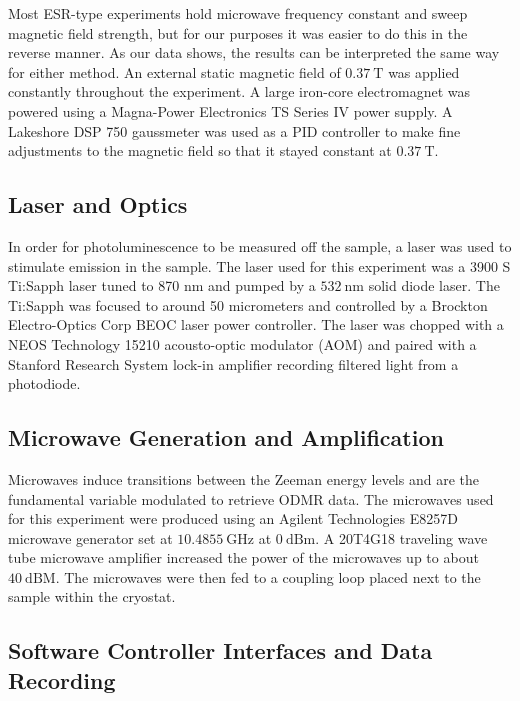 \documentclass[oneside]{BYUPhys}
\begin{document}
Most ESR-type experiments hold microwave frequency constant and sweep magnetic field strength, but for our purposes it was easier to do this in the reverse manner. As our data shows, the results can be interpreted the same way for either method. An external static magnetic field of $0.37~\text{T}$ was applied constantly throughout the experiment. A large iron-core electromagnet was powered using a Magna-Power Electronics TS Series IV power supply. A Lakeshore DSP 750 gaussmeter was used as a PID controller to make fine adjustments to the magnetic field so that it stayed constant at $0.37~\text{T}$.

\subsection{Laser and Optics}

In order for photoluminescence to be measured off the sample, a laser was used to stimulate emission in the sample. The laser used for this experiment was a 3900 S Ti:Sapph laser tuned to 870 nm and pumped by a $532~\text{nm}$ solid diode laser. The Ti:Sapph was focused to around 50 micrometers and controlled by a Brockton Electro-Optics Corp BEOC laser power controller. The laser was chopped with a NEOS Technology 15210 acousto-optic modulator (AOM) and paired with a Stanford Research System lock-in amplifier recording filtered light from a photodiode.

\subsection{Microwave Generation and Amplification}

Microwaves induce transitions between the Zeeman energy levels and are the fundamental variable modulated to retrieve ODMR data. The microwaves used for this experiment were produced using an Agilent Technologies E8257D microwave generator set at $10.4855~\text{GHz}$ at $0~\text{dBm}$. A 20T4G18 traveling wave tube microwave amplifier increased the power of the microwaves up to about $40~\text{dBM}$. The microwaves were then fed to a coupling loop placed next to the sample within the cryostat.

\subsection{Software Controller Interfaces and Data Recording}
\end{document}
